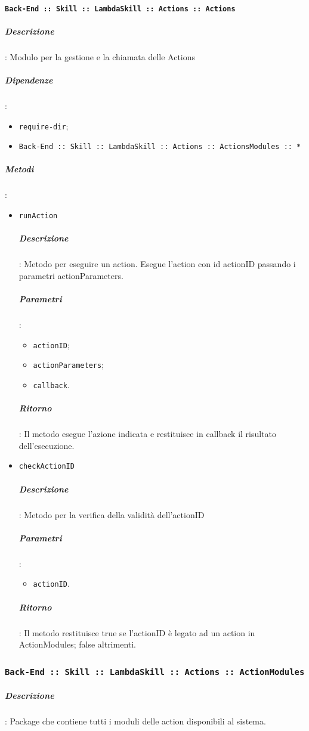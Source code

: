 \documentclass[../DefinizioneDiProdotto_v2.0.0.tex]{subfiles}
\begin{document}
\paragraph{\texttt{Back-End :: Skill :: LambdaSkill :: Actions :: Actions}}
\subparagraph{Descrizione}: Modulo per la gestione e la chiamata delle Actions
\subparagraph{Dipendenze}:
\begin{itemize}
	\item \texttt{require-dir};
	\item \texttt{Back-End :: Skill :: LambdaSkill :: Actions :: ActionsModules :: *}
\end{itemize}
\subparagraph{Metodi}:
\begin{itemize}
	\item \texttt{runAction}
	      \subparagraph{Descrizione}: Metodo per eseguire un action. Esegue l'action con id actionID passando i parametri actionParameters.
	      \subparagraph{Parametri}:
	      \begin{itemize}
	      	\item \texttt{actionID};
	      	\item \texttt{actionParameters};
	      	\item \texttt{callback}.
	      \end{itemize}
	      \subparagraph{Ritorno}: Il metodo esegue l'azione indicata e restituisce in callback il risultato dell'esecuzione.
	\item \texttt{checkActionID}
	      \subparagraph{Descrizione}: Metodo per la verifica della validità dell'actionID
	      \subparagraph{Parametri}:
	      \begin{itemize}
	      	\item \texttt{actionID}.
	      \end{itemize}
	      \subparagraph{Ritorno}: Il metodo restituisce true se l'actionID è legato ad un action in ActionModules; false altrimenti.
\end{itemize}

\subsubsection{\texttt{Back-End :: Skill :: LambdaSkill :: Actions :: ActionModules}}
\subparagraph{Descrizione}:
Package che contiene tutti i moduli delle action disponibili al sistema.
\end{document}
